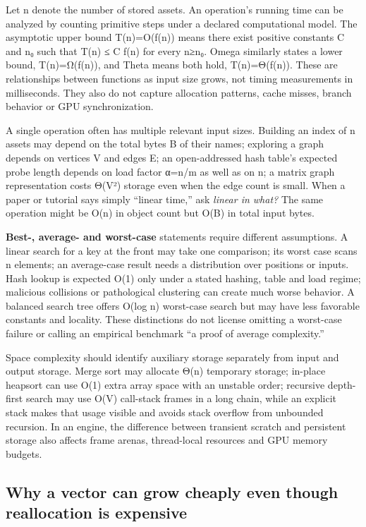 Let n denote the number of stored assets. An operation's running time can be analyzed by counting primitive steps under a declared computational model. The asymptotic upper bound T(n)=O(f(n)) means there exist positive constants C and n₀ such that T(n) ≤ C f(n) for every n≥n₀. Omega similarly states a lower bound, T(n)=Ω(f(n)), and Theta means both hold, T(n)=Θ(f(n)). These are relationships between functions as input size grows, not timing measurements in milliseconds. They also do not capture allocation patterns, cache misses, branch behavior or GPU synchronization.

A single operation often has multiple relevant input sizes. Building an index of n assets may depend on the total bytes B of their names; exploring a graph depends on vertices V and edges E; an open-addressed hash table's expected probe length depends on load factor α=n/m as well as on n; a matrix graph representation costs Θ(V²) storage even when the edge count is small. When a paper or tutorial says simply ``linear time,'' ask \emph{linear in what?} The same operation might be O(n) in object count but O(B) in total input bytes.

\textbf{Best-, average- and worst-case} statements require different assumptions. A linear search for a key at the front may take one comparison; its worst case scans n elements; an average-case result needs a distribution over positions or inputs. Hash lookup is expected O(1) only under a stated hashing, table and load regime; malicious collisions or pathological clustering can create much worse behavior. A balanced search tree offers O(log n) worst-case search but may have less favorable constants and locality. These distinctions do not license omitting a worst-case failure or calling an empirical benchmark ``a proof of average complexity.''

Space complexity should identify auxiliary storage separately from input and output storage. Merge sort may allocate Θ(n) temporary storage; in-place heapsort can use O(1) extra array space with an unstable order; recursive depth-first search may use O(V) call-stack frames in a long chain, while an explicit stack makes that usage visible and avoids stack overflow from unbounded recursion. In an engine, the difference between transient scratch and persistent storage also affects frame arenas, thread-local resources and GPU memory budgets.

\subsection{Why a vector can grow cheaply even though reallocation is expensive}\label{05-engine-i-ch007-why-a-vector-can-grow-cheaply-even-though-reallocation-is-expensive}

